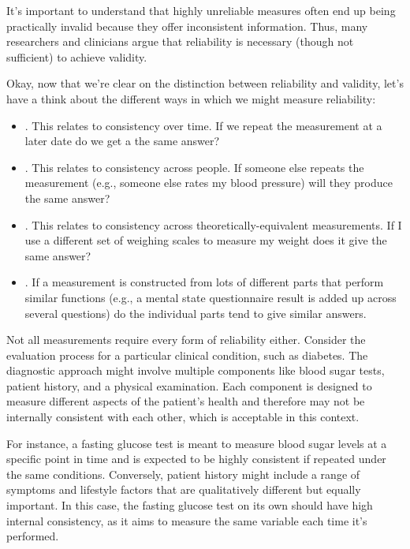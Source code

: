 It's important to understand that highly unreliable measures often end up being practically invalid because they offer inconsistent information. Thus, many researchers and clinicians argue that reliability is necessary (though not sufficient) to achieve validity. 

Okay, now that we're clear on the distinction between reliability and validity, let's have a think about the different ways in which we might measure reliability:

\begin{itemize}
\item {}. This relates to consistency over time. If we repeat the measurement at a later date do we get a the same answer?
\item {}. This relates to consistency across people. If someone else repeats the measurement (e.g., someone else rates my blood pressure) will they produce the same answer?
\item {}. This relates to consistency across theoretically-equivalent measurements. If I use a different set of weighing scales to measure my weight does it give the same answer?
\item {}. If a measurement is constructed from lots of different parts that perform similar functions (e.g., a mental state questionnaire result is added up across several questions) do the individual parts tend to give similar answers.
\end{itemize}

Not all measurements require every form of reliability either. Consider the evaluation process for a particular clinical condition, such as diabetes. The diagnostic approach might involve multiple components like blood sugar tests, patient history, and a physical examination. Each component is designed to measure different aspects of the patient's health and therefore may not be internally consistent with each other, which is acceptable in this context.

For instance, a fasting glucose test is meant to measure blood sugar levels at a specific point in time and is expected to be highly consistent if repeated under the same conditions. Conversely, patient history might include a range of symptoms and lifestyle factors that are qualitatively different but equally important. In this case, the fasting glucose test on its own should have high internal consistency, as it aims to measure the same variable each time it's performed.

